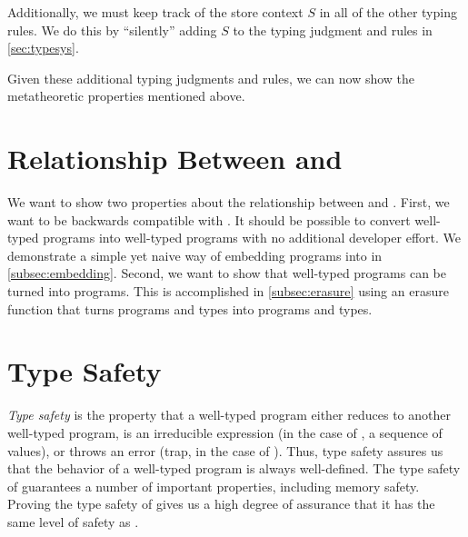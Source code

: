 Additionally, we must keep track of the store context $S$ in all of the other typing rules.
We do this by ``silently'' adding $S$ to the typing judgment and rules in \autoref{sec:typesys}.

Given these additional typing judgments and rules, we can now show the metatheoretic properties mentioned above.

\section{Relationship Between \wasm and \name}
We want to show two properties about the relationship between \wasm and \name.
First, we want \name to be backwards compatible with \wasm.
It should be possible to convert well-typed \wasm programs into well-typed \name programs with no additional developer effort.
We demonstrate a simple yet naive way of embedding \wasm programs into \name in \autoref{subsec:embedding}.
Second, we want to show that well-typed \name programs can be turned into \wasm programs.
This is accomplished in \autoref{subsec:erasure} using an erasure function that turns \name programs and types into \wasm programs and types.




\section{Type Safety}
\label{sec:typesafety}
\emph{Type safety} is the property that a well-typed program either reduces to another well-typed program, is an irreducible expression (in the case of \name, a sequence of values), or throws an error (trap, in the case of \name).
Thus, type safety assures us that the behavior of a well-typed program is always well-defined.
The type safety of \wasm guarantees a number of important properties, including memory safety.
Proving the type safety of \name gives us a high degree of assurance that it has the same level of safety as \wasm.



